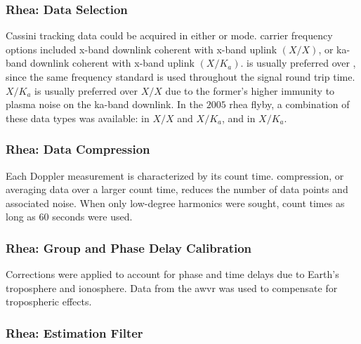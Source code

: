 \documentclass[oneside]{book}
\theoremstyle{mystyle}
\begin{document}
\subsubsection{\footnotesize Rhea: Data Selection}

Cassini tracking data could be acquired in either  or  mode. \Gls{carrier} frequency options included \gls{x-band} \gls{downlink} \gls{coherent} with \gls{x-band} \gls{uplink} $(X/X)$, or \gls{ka-band} \gls{downlink} \gls{coherent} with \gls{x-band} uplink $(X/K_{a})$.  is usually preferred over , since the same \gls{frequency} standard is used throughout the signal round trip time. $X/K_{a}$ is usually preferred over $X/X$ due to the former’s higher immunity to \gls{plasma} noise on the \gls{ka-band} \gls{downlink}. In the $2005$ \gls{rhea} flyby, a combination of these data types was available:  in $X/X$ and $X/K_{a}$, and  in $X/K_{a}$.

\subsubsection{\footnotesize Rhea: Data Compression}

Each Doppler measurement is characterized by its count time. \Gls{compression}, or averaging data over a larger count time, reduces the number of data points and associated noise. When only low-degree harmonics were sought, count times as long as $60$ seconds were used.

\subsubsection{\footnotesize Rhea: Group and Phase Delay Calibration}

Corrections were applied to account for phase and time delays due to Earth's \gls{troposphere} and \gls{ionosphere}. Data from the \gls{awvr} was used to compensate for tropospheric effects.

\subsubsection{\footnotesize Rhea: Estimation Filter}
\end{document}
